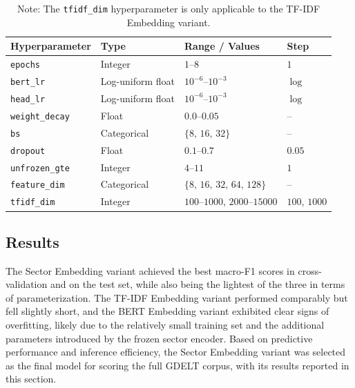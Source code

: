 \begin{table}[ht]
  \centering
  \caption{Hyperparameter search space used for all three model variants in GDELT sector-specific sentiment classification (25 trials each).}
  \label{tab:gdelt_hyperparams}
  \renewcommand{\arraystretch}{1.2}
  \begin{tabular}{|l|l|l|l|}
    \hline
    \textbf{Hyperparameter} & \textbf{Type} & \textbf{Range / Values} & \textbf{Step} \\
    \hline
    \texttt{epochs}          & Integer           & $1$--$8$                                      & $1$           \\
    \texttt{bert\_lr}        & Log-uniform float & $10^{-6}$--$10^{-3}$                          & $\log$        \\
    \texttt{head\_lr}        & Log-uniform float & $10^{-6}$--$10^{-3}$                          & $\log$        \\
    \texttt{weight\_decay}   & Float             & $0.0$--$0.05$                                 & --            \\
    \texttt{bs}              & Categorical       & $\{8,\,16,\,32\}$                             & --            \\
    \texttt{dropout}         & Float             & $0.1$--$0.7$                                  & $0.05$        \\
    \texttt{unfrozen\_gte}   & Integer           & $4$--$11$                                     & $1$           \\
    \texttt{feature\_dim}    & Categorical       & $\{8,\,16,\,32,\,64,\,128\}$                  & --            \\
    \texttt{tfidf\_dim}      & Integer           & $100$--$1000$, $2000$--$15000$                & $100$, $1000$ \\
    \hline
\end{tabular}
\caption*{\footnotesize
Note: The \texttt{tfidf\_dim} hyperparameter is only applicable to the TF-IDF Embedding variant.
}
\end{table}

\subsection{Results}
\label{sec:gdeltresults}

The Sector Embedding variant achieved the best macro-F1 scores in cross-validation and on the test set, while also being the lightest of the three in terms of parameterization. The TF-IDF Embedding variant performed comparably but fell slightly short, and the BERT Embedding variant exhibited clear signs of overfitting, likely due to the relatively small training set and the additional parameters introduced by the frozen sector encoder. Based on predictive performance and inference efficiency, the Sector Embedding variant was selected as the final model for scoring the full GDELT corpus, with its results reported in this section.

